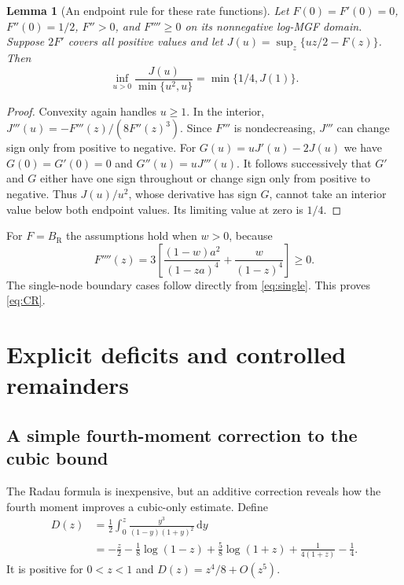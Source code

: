 \documentclass[11pt,letterpaper]{article}
\numberwithin{equation}{section}
\newtheorem{lemma}[theorem]{Lemma}
\theoremstyle{definition}\newtheorem{definition}[theorem]{Definition}
\theoremstyle{remark}\newtheorem{remark}[theorem]{Remark}
\newcommand{\dd}{\,\mathrm d}
\newcommand{\bRad}{B_{\mathrm R}}
\begin{document}
\begin{lemma}[An endpoint rule for these rate functions]\label{lem:endpoint}
Let $F(0)=F'(0)=0$, $F''(0)=1/2$, $F''>0$, and $F''''\ge0$ on
its nonnegative log-MGF domain. Suppose $2F'$ covers all positive
values and let $J(u)=\sup_z\{uz/2-F(z)\}$. Then
\[
 \inf_{u>0}\frac{J(u)}{\min\{u^2,u\}}=
 \min\{1/4,J(1)\}.
\]
\end{lemma}
\begin{proof}
Convexity again handles $u\ge1$. In the interior,
$J'''(u)=-F'''(z)/(8F''(z)^3)$. Since $F'''$ is nondecreasing,
$J'''$ can change sign only from positive to negative. For
$G(u)=uJ'(u)-2J(u)$ we have $G(0)=G'(0)=0$ and
$G''(u)=uJ'''(u)$. It follows successively that $G'$ and $G$ either
have one sign throughout or change sign only from positive to negative.
Thus $J(u)/u^2$, whose derivative has sign $G$, cannot take an interior
value below both endpoint values. Its limiting value at zero is $1/4$.
\end{proof}
For $F=\bRad$ the assumptions hold when $w>0$, because
\[
 F''''(z)=3\left[\frac{(1-w)a^2}{(1-za)^4}
                    +\frac{w}{(1-z)^4}\right]\ge0.
\]
The single-node boundary cases follow directly from \eqref{eq:single}.
This proves \eqref{eq:CR}.

\section{Explicit deficits and controlled remainders}\label{sec:remainder}

\subsection{A simple fourth-moment correction to the cubic bound}
The Radau formula is inexpensive, but an additive correction reveals
how the fourth moment improves a cubic-only estimate. Define
\begin{align}
 D(z)&=\frac12\int_0^z\frac{y^3}{(1-y)(1+y)^2}\dd y\label{eq:defect-int}\\
 &=-\frac z2-\frac18\log(1-z)+\frac58\log(1+z)
                  +\frac1{4(1+z)}-\frac14.\label{eq:defect}
\end{align}
It is positive for $0<z<1$ and $D(z)=z^4/8+O(z^5)$.
\end{document}
